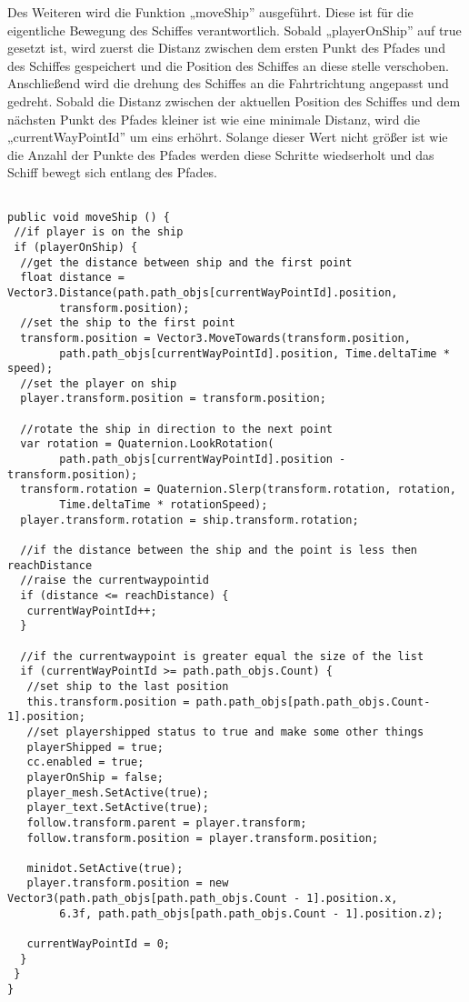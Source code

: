 Des Weiteren wird die Funktion „moveShip” ausgeführt. Diese ist für die eigentliche Bewegung des Schiffes verantwortlich. Sobald „playerOnShip” auf true gesetzt ist, wird zuerst die Distanz zwischen dem ersten Punkt des Pfades und des Schiffes gespeichert und die Position des Schiffes an diese stelle verschoben. Anschließend wird die drehung des Schiffes an die Fahrtrichtung angepasst und gedreht. Sobald die Distanz zwischen der aktuellen Position des Schiffes und dem nächsten Punkt des Pfades kleiner ist wie eine minimale Distanz, wird die „currentWayPointId” um eins erhöhrt. Solange dieser Wert nicht größer ist wie die Anzahl der Punkte des Pfades werden diese Schritte wiedserholt und das Schiff bewegt sich entlang des Pfades.

\begin{scriptsize}
\lstset{
	float,
	caption=Methode moveShip, 
	language=[Sharp]C, 
	frame=single,  
	showstringspaces=false, 
	showspaces=false, 
	numbers=left, 
	captionpos=b, 
	belowcaptionskip=4pt,
	basicstyle=\ttfamily
} 
\begin{lstlisting}[label=lst:methode2]

public void moveShip () {
 //if player is on the ship
 if (playerOnShip) {
  //get the distance between ship and the first point
  float distance = Vector3.Distance(path.path_objs[currentWayPointId].position, 
  		transform.position);
  //set the ship to the first point
  transform.position = Vector3.MoveTowards(transform.position, 
  		path.path_objs[currentWayPointId].position, Time.deltaTime * speed);
  //set the player on ship
  player.transform.position = transform.position;

  //rotate the ship in direction to the next point
  var rotation = Quaternion.LookRotation(
  		path.path_objs[currentWayPointId].position - transform.position);
  transform.rotation = Quaternion.Slerp(transform.rotation, rotation, 
  		Time.deltaTime * rotationSpeed);
  player.transform.rotation = ship.transform.rotation;

  //if the distance between the ship and the point is less then reachDistance 
  //raise the currentwaypointid
  if (distance <= reachDistance) {
   currentWayPointId++;
  }

  //if the currentwaypoint is greater equal the size of the list
  if (currentWayPointId >= path.path_objs.Count) {
   //set ship to the last position
   this.transform.position = path.path_objs[path.path_objs.Count-1].position;
   //set playershipped status to true and make some other things
   playerShipped = true;
   cc.enabled = true;
   playerOnShip = false;
   player_mesh.SetActive(true);
   player_text.SetActive(true);
   follow.transform.parent = player.transform;
   follow.transform.position = player.transform.position;

   minidot.SetActive(true);
   player.transform.position = new Vector3(path.path_objs[path.path_objs.Count - 1].position.x, 
   		6.3f, path.path_objs[path.path_objs.Count - 1].position.z);
                
   currentWayPointId = 0;
  }
 }
}
    
\end{lstlisting}
\end{scriptsize}
